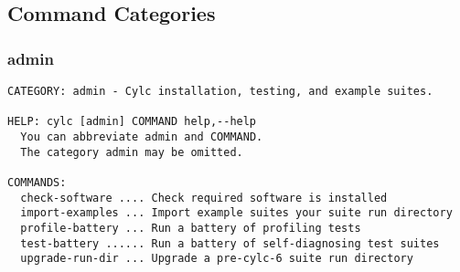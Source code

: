 \subsection{Command Categories}
\subsubsection{admin}
\label{admin}
\begin{lstlisting}
CATEGORY: admin - Cylc installation, testing, and example suites.

HELP: cylc [admin] COMMAND help,--help
  You can abbreviate admin and COMMAND.
  The category admin may be omitted.

COMMANDS:
  check-software .... Check required software is installed
  import-examples ... Import example suites your suite run directory
  profile-battery ... Run a battery of profiling tests
  test-battery ...... Run a battery of self-diagnosing test suites
  upgrade-run-dir ... Upgrade a pre-cylc-6 suite run directory
\end{lstlisting}
